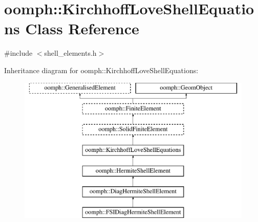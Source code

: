 \hypertarget{classoomph_1_1KirchhoffLoveShellEquations}{}\section{oomph\+:\+:Kirchhoff\+Love\+Shell\+Equations Class Reference}
\label{classoomph_1_1KirchhoffLoveShellEquations}


{\ttfamily \#include $<$shell\+\_\+elements.\+h$>$}

Inheritance diagram for oomph\+:\+:Kirchhoff\+Love\+Shell\+Equations\+:\begin{figure}[H]
\begin{center}
\leavevmode
\includegraphics[height=7.000000cm]{classoomph_1_1KirchhoffLoveShellEquations}
\end{center}
\end{figure}
